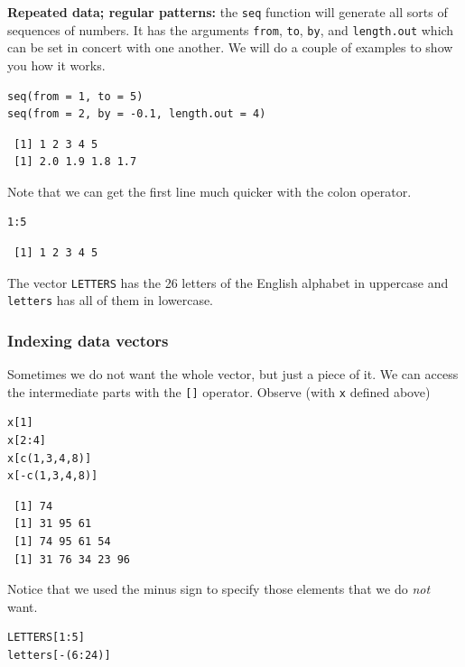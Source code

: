 \documentclass[captions=tableheading]{scrbook}
\begin{document}
\textbf{Repeated data; regular patterns:} the \texttt{seq} function will generate all sorts of sequences of numbers. It has the arguments \texttt{from}, \texttt{to}, \texttt{by}, and \texttt{length.out} which can be set in concert with one another. We will do a couple of examples to show you how it works.


\begin{verbatim}
seq(from = 1, to = 5)
seq(from = 2, by = -0.1, length.out = 4)
\end{verbatim}

\begin{verbatim}
 [1] 1 2 3 4 5
 [1] 2.0 1.9 1.8 1.7
\end{verbatim}

Note that we can get the first line much quicker with the colon operator.


\begin{verbatim}
1:5
\end{verbatim}

\begin{verbatim}
 [1] 1 2 3 4 5
\end{verbatim}

The vector \texttt{LETTERS} has the 26 letters of the English alphabet in uppercase and \texttt{letters} has all of them in lowercase.
\subsubsection{Indexing data vectors}
\label{sec-2-3-3-2}


Sometimes we do not want the whole vector, but just a piece of it. We can access the intermediate parts with the \texttt{[]} operator. Observe (with \texttt{x} defined above)


\begin{verbatim}
x[1]
x[2:4]
x[c(1,3,4,8)]
x[-c(1,3,4,8)]
\end{verbatim}

\begin{verbatim}
 [1] 74
 [1] 31 95 61
 [1] 74 95 61 54
 [1] 31 76 34 23 96
\end{verbatim}

Notice that we used the minus sign to specify those elements that we do \emph{not} want. 


\begin{verbatim}
LETTERS[1:5]
letters[-(6:24)]
\end{verbatim}
\end{document}
